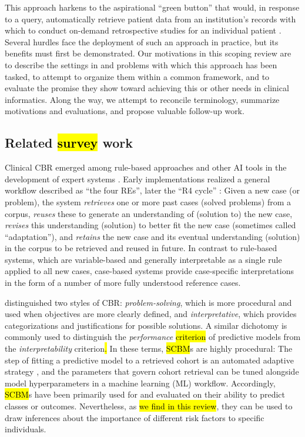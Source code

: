\documentclass[sn-mathphys,Numbered,pdflatex]{sn-jnl}
\theoremstyle{remark}
\theoremstyle{definition}
\begin{document}
This approach harkens to the aspirational ``green button'' that would,
in response to a query, automatically retrieve patient data from an
institution's records with which to conduct on-demand retrospective
studies for an individual patient \citep{Longhurst2014}. Several hurdles
face the deployment of such an approach in practice, but its benefits
must first be demonstrated. Our motivations in this scoping review are
to describe the settings in and problems with which this approach has
been tasked, to attempt to organize them within a common framework, and
to evaluate the promise they show toward achieving this or other needs
in clinical informatics. Along the way, we attempt to reconcile
terminology, summarize motivations and evaluations, and propose valuable
follow-up work.

\subsection{\texorpdfstring{Related
\hl{survey }work}{Related work}}\label{related-work}

Clinical CBR emerged among rule-based approaches and other AI tools in
the development of expert systems \citep{Aamodt1994}. Early
implementations realized a general workflow described as ``the four
REs'', later the ``R4 cycle'' \citep{Aamodt1994, Begum2011}: Given a new
case (or problem), the system \emph{retrieves} one or more past cases
(solved problems) from a corpus, \emph{reuses} these to generate an
understanding of (solution to) the new case, \emph{revises} this
understanding (solution) to better fit the new case (sometimes called
``adaptation''), and \emph{retains} the new case and its eventual
understanding (solution) in the corpus to be retrieved and reused in
future. In contrast to rule-based systems, which are variable-based and
generally interpretable as a single rule applied to all new cases,
case-based systems provide case-specific interpretations in the form of
a number of more fully understood reference cases.

\citet{Kolodner1992} distinguished two styles of CBR:
\emph{problem-solving}, which is more procedural and used when
objectives are more clearly defined, and \emph{interpretative}, which
provides categorizations and justifications for possible solutions. A
similar dichotomy is commonly used to distinguish the \emph{performance}
\hl{criterion }of predictive models from the \emph{interpretability}
criterion\hl{.} In these terms, \hl{SCBM}s are highly procedural: The
step of fitting a predictive model to a retrieved cohort is an automated
adaptive strategy \citep{Begum2011}, and the parameters that govern
cohort retrieval can be tuned alongside model hyperparameters in a
machine learning (ML) workflow. Accordingly, \hl{SCBM}s have been
primarily used for and evaluated on their ability to predict classes or
outcomes. Nevertheless, as \hl{we find in this review}, they can be used
to draw inferences about the importance of different risk factors to
specific individuals.
\end{document}
